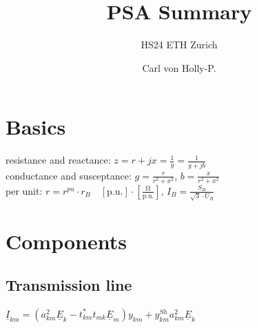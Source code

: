 \documentclass[a4paper,10pt,landscape]{scrartcl}
\title{PSA Summary}
\subtitle{HS24 ETH Zurich}
\author{Carl von Holly-P.}
\begin{document}
\begin{multicols*}{3}
%
\maketitle
\vspace{-1.2cm}
\section{Basics}
resistance and reactance:
$z=r+jx=\frac{1}{y} = \frac{1}{g + jb}$ \\
conductance and susceptance: $g=\frac{r}{r^2 + x^2}$, $b=\frac{x}{r^2 + x^2}$ \\
per unit: $r=r^{pu}\cdot r_{B}\quad\left[\mathrm{p.u.}\right]\cdot\left[\mathrm{\frac{\Omega}{p.u.}}\right]$, $I_B=\frac{S_B}{\sqrt{3}\cdot U_B}$
\section{Components}
\subsection{Transmission line}
$\underline{I}_{k m}=\left(a_{k m}^2 \underline{E}_k-t_{k m}^* t_{m k} \underline{E}_m\right) y_{k m}+y_{k m}^{S h} a_{k m}^2 \underline{E}_k$


\end{multicols*}
\end{document}

